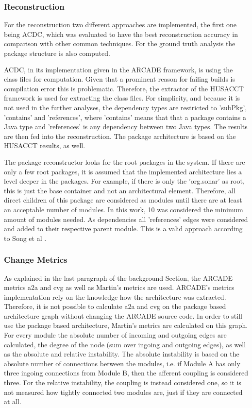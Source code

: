 \documentclass[conference]{IEEEtran}
\begin{document}
\subsubsection{Reconstruction}

For the reconstruction two different approaches are implemented, the first one being ACDC, which was evaluated to have the best reconstruction accuracy \cite{arcRec-comparison} in comparison with other common techniques. For the ground truth analysis the package structure is also computed. 

ACDC, in its implementation given in the ARCADE framework, is using the class files for computation. Given that a prominent reason for failing builds is compilation error this is problematic. Therefore, the extractor of the HUSACCT framework is used for extracting the class files. For simplicity, and because it is not used in the further analyses, the dependency types are restricted to 'subPkg', 'contains' and 'references', where 'contains' means that that a package contains a Java type and 'references' is any dependency between two Java types. The results are then fed into the reconstruction. The package architecture is based on the HUSACCT results, as well. 

The package reconstructor looks for the root packages in the system. If there are only a few root packages, it is assumed that the implemented architecture lies a level deeper in the packages. For example, if there is only the 'org.sonar' as root, this is just the base container and not an architectural element. Therefore, all direct children of this package are considered as modules until there are at least an acceptable number of modules. In this work, 10 was considered the minimum amount of modules needed. As dependencies all 'references' edges were considered and added to their respective parent module. This is a valid approach according to Song et al \cite{ArcAsGraph}. 

\subsubsection{Change Metrics}

As explained in the last paragraph of the background Section, the ARCADE metrics a2a and cvg as well as Martin's metrics are used. ARCADE's metrics implementation rely on the knowledge how the architecture was extracted. Therefore, it is not possible to calculate a2a and cvg on the package based architecture graph without changing the ARCADE source code. In order to still use the package based architecture, Martin's metrics are calculated on this graph. For every module the absolute number of incoming and outgoing edges are calculated, the degree of the node (sum over ingoing and outgoing edges), as well as the absolute and relative instability. The absolute instability is based on the absolute number of connections between the modules, i.e. if Module A has only three ingoing connections from Module B, then the afferent coupling is considered three. For the relative instability, the coupling is instead considered one, so it is not measured how tightly connected two modules are, just if they are connected at all.
\end{document}
